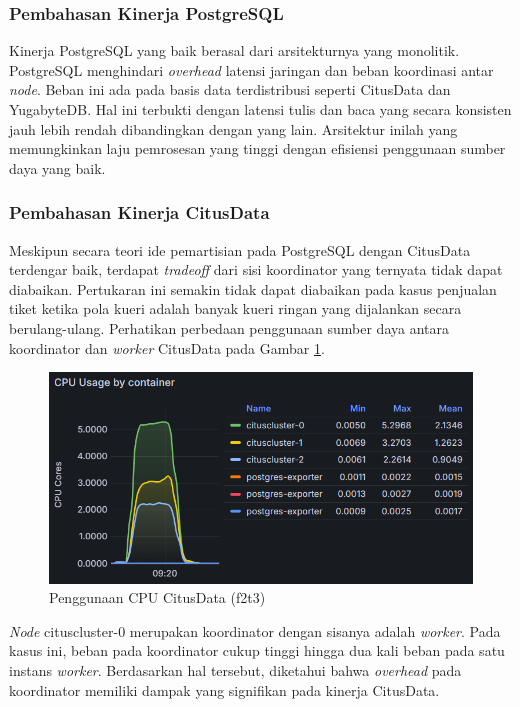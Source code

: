\subsubsection{Pembahasan Kinerja PostgreSQL}

Kinerja PostgreSQL yang baik berasal dari arsitekturnya yang monolitik. PostgreSQL menghindari \textit{overhead} latensi jaringan dan beban koordinasi antar \textit{node}. Beban ini ada pada basis data terdistribusi seperti CitusData dan YugabyteDB. Hal ini terbukti dengan latensi tulis dan baca yang secara konsisten jauh lebih rendah dibandingkan dengan yang lain. Arsitektur inilah yang memungkinkan laju pemrosesan yang tinggi dengan efisiensi penggunaan sumber daya yang baik.

\subsubsection{Pembahasan Kinerja CitusData}

Meskipun secara teori ide pemartisian pada PostgreSQL dengan CitusData terdengar baik, terdapat \textit{tradeoff} dari sisi koordinator yang ternyata tidak dapat diabaikan. Pertukaran ini semakin tidak dapat diabaikan pada kasus penjualan tiket ketika pola kueri adalah banyak kueri ringan yang dijalankan secara berulang-ulang. Perhatikan perbedaan penggunaan sumber daya antara koordinator dan \textit{worker} CitusData pada Gambar \ref{fig:citusdata-usage}.

\begin{figure}[htbp]
    \centering
    \includegraphics[width=1\textwidth]{resources/chapter-4/citusdata-usage.png}
    \caption{Penggunaan CPU CitusData (f2t3)}
    \label{fig:citusdata-usage}
\end{figure}

\textit{Node} cituscluster-0 merupakan koordinator dengan sisanya adalah \textit{worker}. Pada kasus ini, beban pada koordinator cukup tinggi hingga dua kali beban pada satu instans \textit{worker}. Berdasarkan hal tersebut, diketahui bahwa \textit{overhead} pada koordinator memiliki dampak yang signifikan pada kinerja CitusData.

